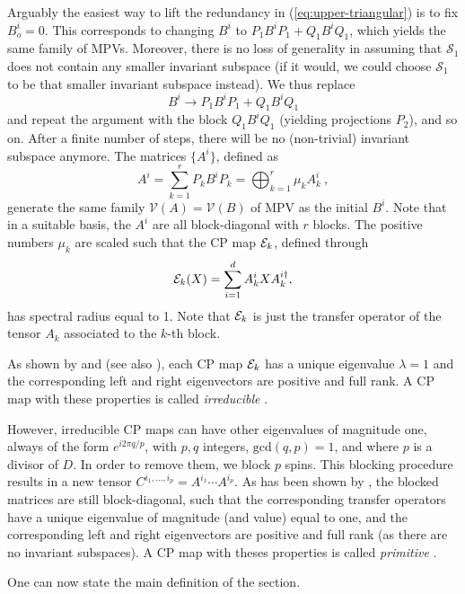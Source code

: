 \documentclass[rmp,aps,reprint,superscriptaddress,nobalancelastpage]{revtex4-1}
\newcommand{\be}{\begin{equation}}
\newcommand{\ee}{\end{equation}}
\begin{document}
Arguably the easiest way to lift the redundancy  in (\ref{eq:upper-triangular}) is to fix $B^i_o=0$. This corresponds to changing $B^i$ to $P_1B^iP_1+ Q_1B^iQ_1$, which yields the same family of MPVs.  Moreover, there is no loss of generality in assuming that $\mathcal S_1$ does not contain any smaller invariant subspace (if it would, we could choose $\mathcal S_1$ to be that smaller invariant subspace instead).  We thus replace
\[
    B^i \to P_1B^iP_1+ Q_1B^iQ_1
\]
and repeat the argument with the block $Q_1B^iQ_1$ (yielding projections $P_2$), and so on.
After a finite number of steps, there will be no (non-trivial) invariant subspace anymore. The matrices $\{A^i\}$, defined as
\be
    \label{eq:II_Aiplusk1}
    A^i = \sum_{k=1}^r P_k B^i P_k = \bigoplus_{k=1}^r \mu_k A^i_k\ ,
\ee
generate the same family $\mathcal V(A)=\mathcal V(B)$ of MPV as the initial $B^i$. Note that in a suitable basis, the $A^i$ are all block-diagonal with $r$ blocks.  The positive numbers $\mu_k$ are scaled such that the CP map ${\cal E}_k$, defined through
\be
    \label{Ek}
    {\cal E}_k (X) = \sum_{i=1}^d A_k^i X A_k^{i\dagger},
\ee
has spectral radius equal to 1. Note that ${\cal E}_k$ is just the transfer operator of  the tensor $A_k$  associated to the $k$-th block.

As shown by \textcite{fannes:FCS} and \textcite{perez-garcia:mps-reps} (see also \textcite{wolf:channel-notes}), each CP map ${\cal E}_k$ has a unique eigenvalue $\lambda=1$ and the corresponding left and right eigenvectors are positive and full rank. A CP map with these properties is called {\it irreducible} \cite{wolf:channel-notes}.




However, irreducible CP maps can have other eigenvalues of magnitude one,
always of the form $e^{i 2\pi q/p}$, with $p,q$ integers, $\mathrm{gcd}(q,p)=1$,
and where $p$ is a divisor of $D$. In order to remove them, we block
$p$ spins. This blocking procedure results in a new tensor $C^{i_1,\ldots, i_p}=A^{i_1}\cdots A^{i_p}$. As has been shown by \textcite{cadarso:fractionalization}, the blocked matrices are still block-diagonal, such that the  corresponding transfer operators have a unique eigenvalue of magnitude (and value)
equal to one, and the corresponding left and right eigenvectors are
positive and full rank (as there are no invariant subspaces). A CP map with theses properties is called {\it primitive} \cite{wolf:channel-notes}.




One can now state the main definition of the section.
\end{document}
